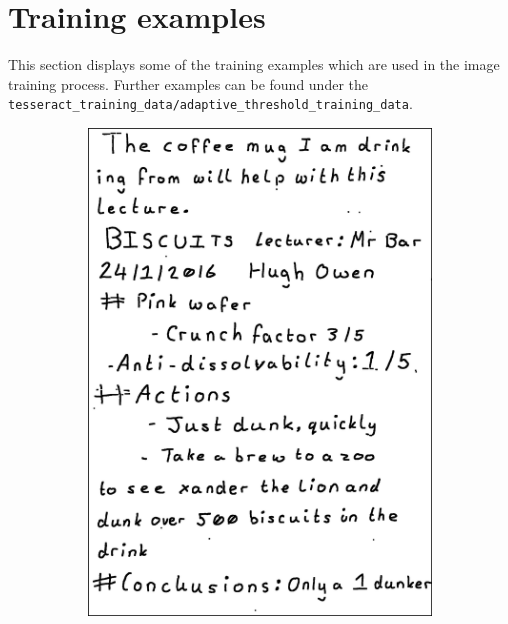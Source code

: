 \section{Training examples} \label{tesseract:training}
This section displays some of the training examples which are used in the image training process. Further examples can be found under the \texttt{tesseract\_training\_data/adaptive\_threshold\_training\_data}.
\begin{figure}[H]
  \centering
  \begin{subfigure}[h]{0.35\textwidth}
    \includegraphics[scale=0.35]{images/training_data_1}
    \caption{}
    \label{fig:first_tesseract}
  \end{subfigure}

  \hspace{1em}


\end{figure}
